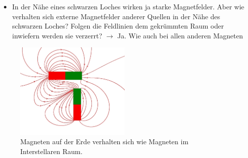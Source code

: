 \begin{frame}
  \begin{itemize}
    \setlength\itemsep{2em}
    \item In der Nähe eines schwarzen Loches wirken ja starke Magnetfelder. Aber
    wie verhalten sich externe Magnetfelder anderer Quellen in der Nähe des
    schwarzen Loches? Folgen die Feldlinien dem gekrümmten Raum oder inwiefern
    werden sie verzerrt?
    $\longrightarrow$ Ja. Wie auch bei allen anderen Magneten
  \end{itemize}
\begin{figure}[H]
  \centering
  \includegraphics[width=0.5\textwidth]{images/Frage3.PNG}
  \caption{Magneten auf der Erde verhalten sich wie Magneten im Interstellaren Raum.}
\end{figure}
\end{frame}
